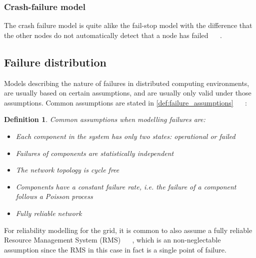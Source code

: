 \documentclass{cslthse-msc}
\newtheorem{definition}{Definition}[chapter]
\begin{document}
\subsubsection{Crash-failure model}
The crash failure model is quite alike the fail-stop model with the difference that the other nodes do not automatically detect that a node has failed ~\cite{faultTolerantFundamentals} ~\cite{adaptiveAgentReplication}.

\subsection{Failure distribution} \label{subsec:background_failure_distribution}
Models describing the nature of failures in distributed computing environments, are usually based on certain assumptions, and are usually only valid under those assumptions. Common assumptions are stated in \autoref{def:failure_assumptions} ~\cite{relModelDistSimSystem} \cite{relModelAnalysis}  \cite{cloudServiceRel} \cite{studyServiceRel} \cite{hierarchicalRelModeling} ~\cite{selfAdaptRel}:

\begin{definition} \label{def:failure_assumptions}
Common assumptions when modelling failures are:
\begin{itemize}
	\item Each component in the system has only two states: operational or failed
	\item Failures of components are statistically independent
	\item The network topology is cycle free
	\item Components have a constant failure rate, i.e. the failure of a component follows a Poisson process
	\item Fully reliable network
\end{itemize}
\end{definition}

For reliability modelling for the grid, it is common to also assume a fully reliable Resource Management System (RMS) ~\cite{relAndPerfGridServices} ~\cite{relGridServicePredConstraint}, which is an non-neglectable assumption since the RMS in this case in fact is a single point of failure.

\end{document}
